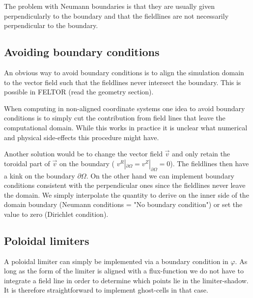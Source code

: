The problem with Neumann boundaries is that they are usually given 
perpendicularly to the boundary and that the fieldlines are not necessarily
perpendicular to the boundary. 

\subsection{Avoiding boundary conditions}
An obvious way to avoid boundary conditions is to
align the simulation domain to the vector field such that the fieldlines
never intersect the boundary. This is possible in FELTOR (read the
geometry section).

When computing in non-aligned coordinate systems
one idea to avoid boundary conditions 
is to simply cut the contribution from field lines
that leave the computational domain. While this works in practice
it is unclear what numerical and physical side-effects this procedure might have. 

Another solution would be to change the 
vector field $\vec v$ and only retain the toroidal part of $\vec v$ on the 
boundary ( $v^R|_{\partial\Omega} = v^Z|_{\partial\Omega} =0$). The fieldlines then have a kink on the boundary $\partial\Omega$. 
On the other hand we can implement boundary conditions consistent with 
the perpendicular ones since the fieldlines never leave the domain. 
We simply interpolate the quantity to derive on the inner side of the
domain boundary (Neumann conditions = "No boundary condition") or 
set the value to zero (Dirichlet condition).

\subsection{Poloidal limiters}
A poloidal limiter can simply be implemented via a boundary condition in $\varphi$. 
As long as the form of the limiter is aligned with a flux-function we do not have to 
integrate a field line in order to determine which points lie in the
limiter-shadow. It is therefore straightforward to implement ghost-cells 
in that case. 


